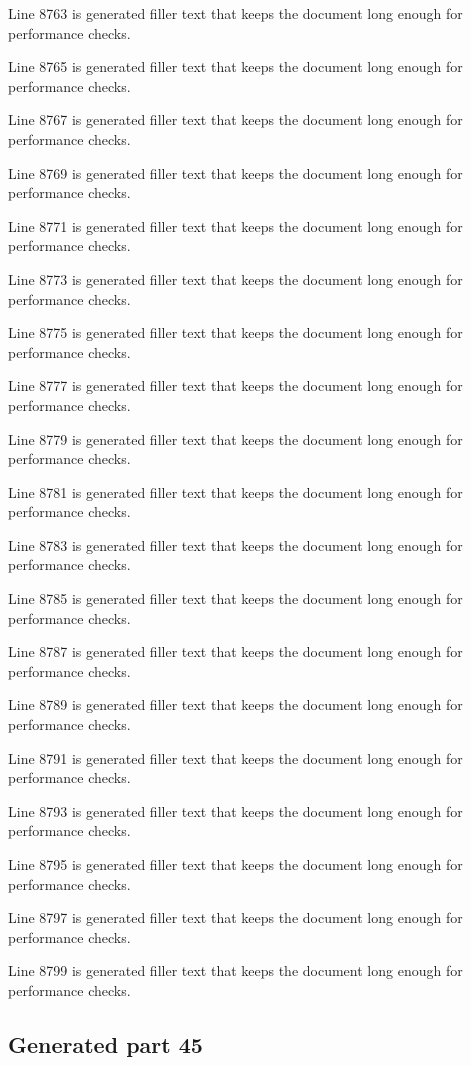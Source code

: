 Line 8763 is generated filler text that keeps the document long enough for performance checks.

Line 8765 is generated filler text that keeps the document long enough for performance checks.

Line 8767 is generated filler text that keeps the document long enough for performance checks.

Line 8769 is generated filler text that keeps the document long enough for performance checks.

Line 8771 is generated filler text that keeps the document long enough for performance checks.

Line 8773 is generated filler text that keeps the document long enough for performance checks.

Line 8775 is generated filler text that keeps the document long enough for performance checks.

Line 8777 is generated filler text that keeps the document long enough for performance checks.

Line 8779 is generated filler text that keeps the document long enough for performance checks.

Line 8781 is generated filler text that keeps the document long enough for performance checks.

Line 8783 is generated filler text that keeps the document long enough for performance checks.

Line 8785 is generated filler text that keeps the document long enough for performance checks.

Line 8787 is generated filler text that keeps the document long enough for performance checks.

Line 8789 is generated filler text that keeps the document long enough for performance checks.

Line 8791 is generated filler text that keeps the document long enough for performance checks.

Line 8793 is generated filler text that keeps the document long enough for performance checks.

Line 8795 is generated filler text that keeps the document long enough for performance checks.

Line 8797 is generated filler text that keeps the document long enough for performance checks.

Line 8799 is generated filler text that keeps the document long enough for performance checks.

\subsection{Generated part 45}

